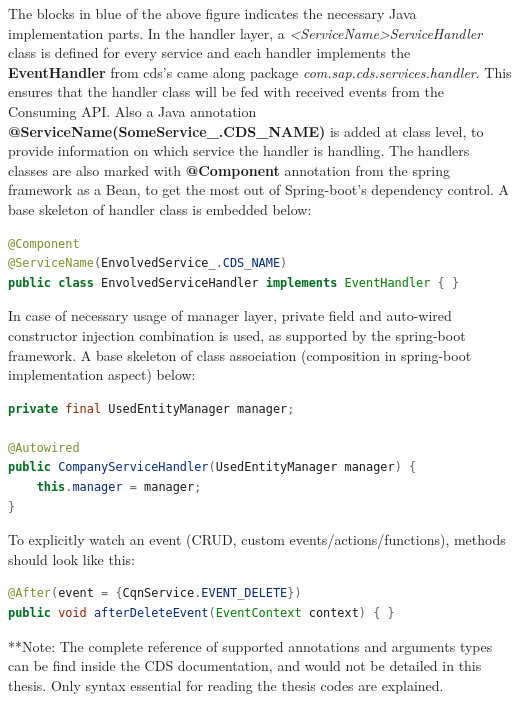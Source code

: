 The blocks in blue of the above figure indicates the necessary Java implementation parts. In the handler layer, a \textit{<ServiceName>ServiceHandler} class is defined for every service and each handler implements the \textbf{EventHandler} from cds's came along package \textit{com.sap.cds.services.handler}. This ensures that the handler class will be fed with received events from the Consuming API. Also a Java annotation \textbf{@ServiceName(SomeService\_.CDS\_NAME)} is added at class level, to provide information on which service the handler is handling. The handlers classes are also marked with \textbf{@Component} annotation from the spring framework as a Bean, to get the most out of Spring-boot's dependency control. A base skeleton of handler class is embedded below:

\begin{lstlisting}[language={java}]
@Component
@ServiceName(EnvolvedService_.CDS_NAME)
public class EnvolvedServiceHandler implements EventHandler { }
\end{lstlisting}

In case of necessary usage of manager layer, private field and auto-wired constructor injection combination is used, as supported by the spring-boot framework. A base skeleton of class association (composition in spring-boot implementation aspect) below:

\begin{lstlisting}[language={java}]
private final UsedEntityManager manager;

@Autowired
public CompanyServiceHandler(UsedEntityManager manager) {
    this.manager = manager;
}
\end{lstlisting}

To explicitly watch an event (CRUD, custom events/actions/functions), methods should look like this:
\begin{lstlisting}[language={java}]
@After(event = {CqnService.EVENT_DELETE})
public void afterDeleteEvent(EventContext context) { }
\end{lstlisting}

\bigskip
**Note: The complete reference of supported annotations and arguments types can be find inside the CDS documentation, and would not be detailed in this thesis. Only syntax essential for reading the thesis codes are explained.

